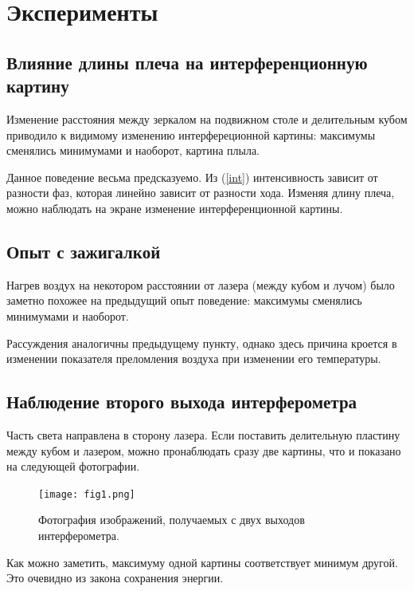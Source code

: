 \documentclass[a4paper, 12pt]{article}
\begin{document}
	\section*{Эксперименты}
	\subsection*{Влияние длины плеча на интерференционную картину}
	Изменение расстояния между зеркалом на подвижном столе и делительным кубом приводило к видимому изменению интерфереционной картины: максимумы сменялись минимумами и наоборот, картина плыла.
	
	Данное поведение весьма предсказуемо. Из (\ref{int}) интенсивность зависит от разности фаз, которая линейно зависит от разности хода. Изменяя длину плеча, можно наблюдать на экране изменение интерференционной картины.
	\subsection*{Опыт с зажигалкой}
	Нагрев воздух на некотором расстоянии от лазера (между кубом и лучом) было заметно похожее на предыдущий опыт поведение: максимумы сменялись минимумами и наоборот. 
	
	Рассуждения аналогичны предыдущему пункту, однако здесь причина кроется в изменении показателя преломления воздуха при изменении его температуры.
	\subsection*{Наблюдение второго выхода интерферометра}
	Часть света направлена в сторону лазера. Если поставить делительную пластину между кубом и лазером, можно пронаблюдать сразу две картины, что и показано на следующей фотографии.
	\begin{figure}[H]
		\centering
		\texttt{[image: fig1.png]}
		\caption{Фотография изображений, получаемых с двух выходов интерферометра.}
		\label{fig:3}
	\end{figure}
	Как можно заметить, максимуму одной картины соответствует минимум другой. Это очевидно из закона сохранения энергии.
\end{document}
